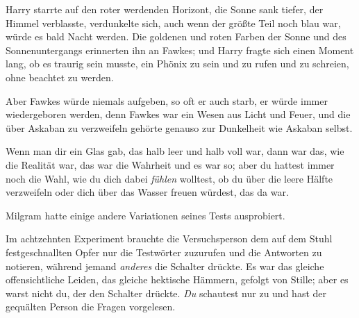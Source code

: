 Harry starrte auf den roter werdenden Horizont, die Sonne sank tiefer, der Himmel verblasste, verdunkelte sich, auch wenn der größte Teil noch blau war, würde es bald Nacht werden. Die goldenen und roten Farben der Sonne und des Sonnenuntergangs erinnerten ihn an Fawkes; und Harry fragte sich einen Moment lang, ob es traurig sein musste, ein Phönix zu sein und zu rufen und zu schreien, ohne beachtet zu werden.

Aber Fawkes würde niemals aufgeben, so oft er auch starb, er würde immer wiedergeboren werden, denn Fawkes war ein Wesen aus Licht und Feuer, und die über Askaban zu verzweifeln gehörte genauso zur Dunkelheit wie Askaban selbst.

Wenn man dir ein Glas gab, das halb leer und halb voll war, dann war das, wie die Realität war, das war die Wahrheit und es war so; aber du hattest immer noch die Wahl, wie du dich dabei \emph{fühlen} wolltest, ob du über die leere Hälfte verzweifeln oder dich über das Wasser freuen würdest, das da war.

Milgram hatte einige andere Variationen seines Tests ausprobiert.

Im achtzehnten Experiment brauchte die Versuchsperson dem auf dem Stuhl festgeschnallten Opfer nur die Testwörter zuzurufen und die Antworten zu notieren, während jemand \emph{anderes} die Schalter drückte. Es war das gleiche offensichtliche Leiden, das gleiche hektische Hämmern, gefolgt von Stille; aber es warst nicht du, der den Schalter drückte. \emph{Du} schautest nur zu und hast der gequälten Person die Fragen vorgelesen.

